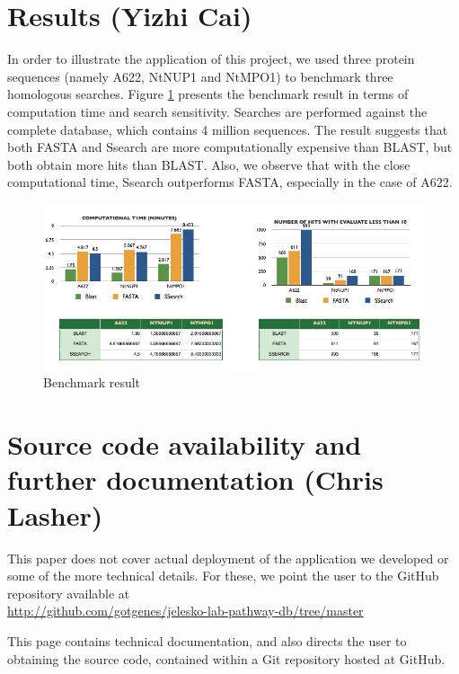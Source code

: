 \documentclass[11pt,letterpaper,twoside,english]{article}
\begin{document}
\section{Results (Yizhi Cai)}

In order to illustrate the application of this project, we used three
protein sequences (namely A622, NtNUP1 and NtMPO1) to benchmark three
homologous searches. Figure \ref{fig:Benchmark-result} presents the
benchmark result in terms of computation time and search sensitivity.
Searches are performed against the complete database, which contains
4 million sequences. The result suggests that both FASTA and Ssearch
are more computationally expensive than BLAST, but both obtain more
hits than BLAST. Also, we observe that with the close computational
time, Ssearch outperforms FASTA, especially in the case of A622.

\begin{figure}[tbph]
    \begin{center}
        \includegraphics[width=1\linewidth]{figures/Bench_mark_result}
    \end{center}
    \caption{\label{fig:Benchmark-result}Benchmark result}
\end{figure}

\section{Source code availability and further documentation (Chris Lasher)}

This paper does not cover actual deployment of the application we developed or
some of the more technical details. For these, we point the user to the GitHub
repository available at \\
\href{http://github.com/gotgenes/jelesko-lab-pathway-db/tree/master}{http://github.com/gotgenes/jelesko-lab-pathway-db/tree/master}

This page contains technical documentation, and also directs the user to
obtaining the source code, contained within a Git repository hosted at GitHub.
\end{document}
